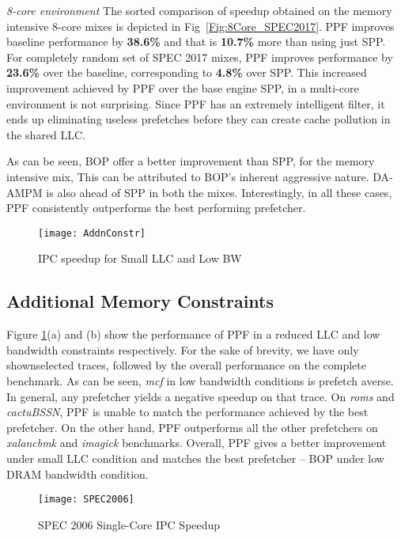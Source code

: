 \textit{8-core environment} The sorted comparison of speedup obtained 
on the memory intensive 8-core mixes is depicted in Fig~\ref{Fig:8Core_SPEC2017}.
PPF improves baseline performance by \textbf{38.6\%} and that is \textbf{10.7\%} 
more than using just SPP. 
For completely random set of SPEC 2017 mixes, PPF improves performance by 
\textbf{23.6\%} over the baseline, corresponding to \textbf{4.8\%} over SPP.
This increased improvement achieved by PPF over the base engine SPP,
in a multi-core environment is not surprising. 
Since PPF has an extremely intelligent filter, it ends up 
eliminating useless prefetches before they can create cache
pollution in the shared LLC. 

As can be seen, BOP offer a better improvement than 
SPP, for the memory intensive mix, This can be attributed 
to BOP's inherent aggressive nature. DA-AMPM is also ahead of
SPP in both the mixes. Interestingly, in all these cases, 
PPF consistently outperforms the best performing prefetcher.


\begin{figure}[ht]
\texttt{[image: AddnConstr]}
\caption{IPC speedup for Small LLC and Low BW}
\label{Fig:AddnConstr}
\end{figure}

\subsection{Additional Memory Constraints}
\label{Results-AdditionalMem}

Figure \ref{Fig:AddnConstr}(a) and (b) show the performance of PPF in a 
reduced LLC and low bandwidth constraints respectively. For the sake of brevity, 
we have only shownselected traces, followed
by the overall performance on the complete benchmark.
As can be seen, \textit{mcf} in low bandwidth conditions is prefetch averse.
In general, any prefetcher yields a negative speedup on that trace.
On \textit{roms} and \textit{cactuBSSN}, PPF is unable to match the performance 
achieved by the best prefetcher. On the other hand, PPF outperforms all the 
other prefetchers on \textit{xalancbmk} and \textit{imagick} benchmarks.
Overall, PPF gives a better improvement under small LLC condition and 
matches the best prefetcher -- BOP under low DRAM bandwidth condition.

\begin{figure}[ht]
\texttt{[image: SPEC2006]}
\caption{SPEC 2006 Single-Core IPC Speedup}
\label{Fig:SPEC2006_1core}
\end{figure}

